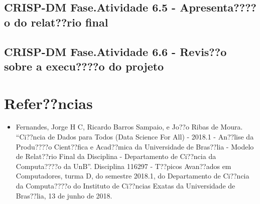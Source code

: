 \documentclass[]{article}
\providecommand{\tightlist}{%
  \setlength{\itemsep}{0pt}\setlength{\parskip}{0pt}}
\begin{document}
\subsection{CRISP-DM Fase.Atividade 6.5 - Apresenta????o do relat??rio
final}\label{crisp-dm-fase.atividade-6.5---apresentao-do-relatrio-final}

\subsection{CRISP-DM Fase.Atividade 6.6 - Revis??o sobre a execu????o do
projeto}\label{crisp-dm-fase.atividade-6.6---reviso-sobre-a-execuo-do-projeto}

\section{Refer??ncias}\label{referncias}

\begin{itemize}
\tightlist
\item
  Fernandes, Jorge H C, Ricardo Barros Sampaio, e Jo??o Ribas de Moura.
  ``Ci??ncia de Dados para Todos (Data Science For All) - 2018.1 -
  An??lise da Produ????o Cient??fica e Acad??mica da Universidade de
  Bras??lia - Modelo de Relat??rio Final da Disciplina - Departamento de
  Ci??ncia da Computa????o da UnB''. Disciplina 116297 - T??picos
  Avan??ados em Computadores, turma D, do semestre 2018.1, do
  Departamento de Ci??ncia da Computa????o do Instituto de Ci??ncias
  Exatas da Universidade de Bras??lia, 13 de junho de 2018.
\end{itemize}
\end{document}
